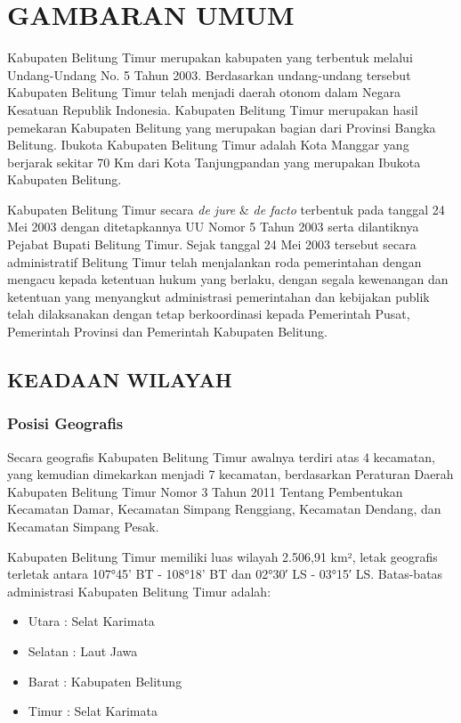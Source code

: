 \chapter{GAMBARAN UMUM}

Kabupaten Belitung Timur merupakan kabupaten yang terbentuk melalui Undang-Undang No. 5 Tahun 2003. Berdasarkan undang-undang tersebut Kabupaten Belitung Timur telah menjadi daerah otonom dalam Negara Kesatuan Republik Indonesia. Kabupaten Belitung Timur merupakan hasil pemekaran Kabupaten Belitung yang merupakan bagian dari Provinsi Bangka Belitung. Ibukota Kabupaten Belitung Timur adalah Kota Manggar yang berjarak sekitar 70 Km dari Kota Tanjungpandan yang merupakan Ibukota Kabupaten Belitung.

Kabupaten Belitung Timur secara \emph{de jure} \& \emph{de facto} terbentuk pada tanggal 24
Mei 2003 dengan ditetapkannya UU Nomor 5 Tahun 2003 serta dilantiknya
Pejabat Bupati Belitung Timur. Sejak tanggal 24 Mei 2003 tersebut
secara administratif Belitung Timur telah menjalankan roda pemerintahan
dengan mengacu kepada ketentuan hukum yang berlaku, dengan segala
kewenangan dan ketentuan yang menyangkut administrasi pemerintahan
dan kebijakan publik telah dilaksanakan dengan tetap berkoordinasi
kepada Pemerintah Pusat, Pemerintah Provinsi dan Pemerintah Kabupaten
Belitung.

\section{KEADAAN WILAYAH}

\subsection{Posisi Geografis}

Secara geografis Kabupaten Belitung Timur awalnya terdiri atas 4 kecamatan,
yang kemudian dimekarkan menjadi 7 kecamatan, berdasarkan Peraturan
Daerah Kabupaten Belitung Timur Nomor 3 Tahun 2011 Tentang Pembentukan
Kecamatan Damar, Kecamatan Simpang Renggiang, Kecamatan Dendang, dan
Kecamatan Simpang Pesak.

Kabupaten Belitung Timur memiliki luas wilayah 2.506,91 km², letak
geografis terletak antara 107°45' BT - 108°18' BT dan 02°30′ LS -
03°15′ LS. Batas-batas administrasi Kabupaten Belitung Timur adalah:
\begin{itemize}
	\item Utara : Selat Karimata
	\item Selatan : Laut Jawa
	\item Barat : Kabupaten Belitung
	\item Timur : Selat Karimata
\end{itemize}


